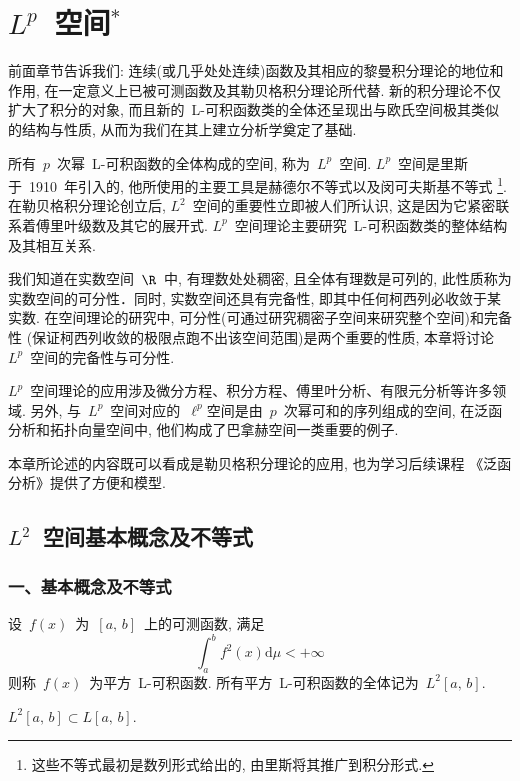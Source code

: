 \chapter{$L^{p}$~空间$^*$}

前面章节告诉我们: 连续(或几乎处处连续)函数及其相应的黎曼积分理论的地位和作用, 在一定意义上已被可测函数及其勒贝格积分理论所代替. 新的积分理论不仅扩大了积分的对象, 而且新的~L-可积函数类的全体还呈现出与欧氏空间极其类似的结构与性质, 从而为我们在其上建立分析学奠定了基础.

所有~$p$~次幂~L-可积函数的全体构成的空间, 称为~$L^p$~空间. $L^p$~空间是里斯于~1910~年引入的, 他所使用的主要工具是赫德尔不等式以及闵可夫斯基不等式
\footnote{这些不等式最初是数列形式给出的, 由里斯将其推广到积分形式.}. 在勒贝格积分理论创立后, $L^2$~空间的重要性立即被人们所认识, 这是因为它紧密联系着傅里叶级数及其它的展开式. $L^p$~空间理论主要研究~L-可积函数类的整体结构及其相互关系.

我们知道在实数空间~$\R$~中, 有理数处处稠密, 且全体有理数是可列的, 此性质称为实数空间的可分性．同时, 实数空间还具有完备性, 即其中任何柯西列必收敛于某实数. 在空间理论的研究中, 可分性(可通过研究稠密子空间来研究整个空间)和完备性
(保证柯西列收敛的极限点跑不出该空间范围)是两个重要的性质, 本章将讨论~$L^p$~空间的完备性与可分性.

$L^p$~空间理论的应用涉及微分方程、积分方程、傅里叶分析、有限元分析等许多领域. 另外, 与~$L^p$~空间对应的~$\ell^p$空间是由~$p$~次幂可和的序列组成的空间, 在泛函分析和拓扑向量空间中, 他们构成了巴拿赫空间一类重要的例子.

本章所论述的内容既可以看成是勒贝格积分理论的应用, 也为学习后续课程
《泛函分析》提供了方便和模型.

\section{$L^2$~空间基本概念及不等式}

\subsection*{一、基本概念及不等式}

\begin{Definition}\label{Def-6-2}

设~$f(x)$~为~$\left[a,\,b\right]$~上的可测函数, 满足
\[
\int_{a}^{b}f^{2}(x)\mathrm{d}\mu<+\infty
\]
则称~$f(x)$~为平方~L-可积函数. 所有平方~L-可积函数的全体记为~$L^2[a,\,b]$.
\end{Definition}

\begin{Proposition}\label{Pro-6-1}

$L^2[a,\,b]\subset L[a,\,b]$.
\end{Proposition}

